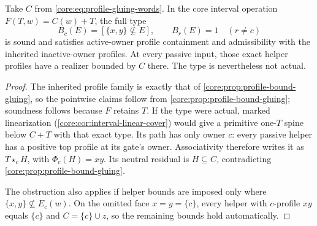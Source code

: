 \begin{corollary}
\label{core:cor:pointwise-helper-obstruction}
Take $C$ from \eqref{core:eq:profile-gluing-words}. In the core interval
operation $F(T,w)=C(w)+T$, the full type
\[
 B_c(E)=[\{x,y\}\nsubseteq E],\qquad B_r(E)=1\quad(r\ne c)
\]
is sound and satisfies active-owner profile containment and admissibility
with the inherited inactive-owner profiles. At every passive input, those
exact helper profiles have a realizer bounded by $C$ there. The type is
nevertheless not actual.
\end{corollary}
\begin{proof}
The inherited profile family is exactly that of
\cref{core:prop:profile-bound-gluing}, so the pointwise
claims follow from \cref{core:prop:profile-bound-gluing}; soundness follows
because $F$ retains $T$. If the type were actual, marked linearization
(\cref{core:cor:interval-linear-cover}) would give a primitive one-$T$
spine below $C+T$ with that exact type. Its path has only owner $c$:
every passive helper has a positive top profile at its gate's owner.
Associativity therefore writes it as $T\star_c H$, with
$\Phi_c(H)=xy$. Its neutral residual is $H\subseteq C$, contradicting
\cref{core:prop:profile-bound-gluing}.

The obstruction also applies if helper bounds are imposed only where
$\{x,y\}\nsubseteq E_c(w)$. On the omitted face $x=y=\{c\}$, every
helper with $c$-profile $xy$ equals $\{c\}$ and
$C=\{c\}\cup z$, so the remaining bounds hold automatically.
\end{proof}
